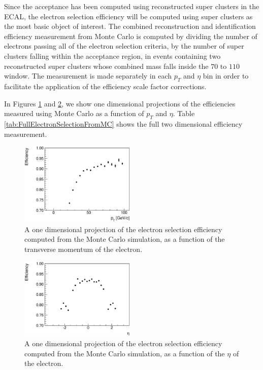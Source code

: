 \documentclass{cmspaper}
\begin{document}
\label{sec:electronEfficiency}
Since the acceptance has been computed using reconstructed super clusters in the ECAL, the electron selection efficiency will be computed using super clusters as the most basic object of interest. The combined reconstruction and identification efficiency measurement from Monte Carlo is computed by dividing the number of electrons passing all of the electron selection criteria, by the number of super clusters falling within the acceptance region, in events containing two reconstructed super clusters whose combined mass falls inside the $70$ to $110$ \GeVcc~ window. The measurement is made separately in each $p_{T}$ and $\eta$ bin in order to facilitate the application of the efficiency scale factor corrections. 

In Figures \ref{fig:FullElectronSelectionFromMC_Pt} and \ref{fig:FullElectronSelectionFromMC_Eta}, we show one dimensional projections of the efficiencies measured using Monte Carlo as a function of $p_{T}$ and $\eta$. Table \ref{tab:FullElectronSelectionFromMC} shows the full two dimensional efficiency measurement.


\begin{figure}[htb]
  \begin{center}
    \includegraphics[width=0.49\textwidth]{plots/Efficiency_Total_Unbiased_Pt.eps} 
    \caption{A one dimensional projection of the electron selection efficiency computed from the Monte Carlo simulation, as a function of the transverse momentum of the electron.}
    \label{fig:FullElectronSelectionFromMC_Pt}
  \end{center}
\end{figure}

\begin{figure}[htb]
  \begin{center}
    \includegraphics[width=0.49\textwidth]{plots/Efficiency_Total_Unbiased_Eta.eps} 
    \caption{A one dimensional projection of the electron selection efficiency computed from the Monte Carlo simulation, as a function of the $\eta$ of the electron.}
    \label{fig:FullElectronSelectionFromMC_Eta}
  \end{center}
\end{figure}
\end{document}
